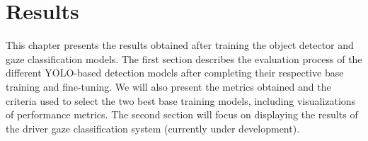 \chapter{Results}\label{ch:results}

This chapter presents the results obtained after training the object detector and gaze classification models. The first section describes the evaluation process of the different YOLO-based detection models after completing their respective base training and fine-tuning. We will also present the metrics obtained and the criteria used to select the two best base training models, including visualizations of performance metrics. The second section will focus on displaying the results of the driver gaze classification system (currently under development).


